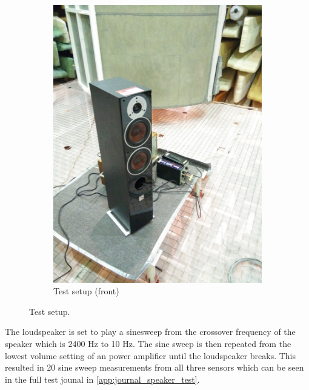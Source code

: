 \begin{figure}[H]
\begin{subfigure}[t]{0.47\textwidth}
	\includegraphics[width=1\textwidth]{figures/Test_setup_front.jpg}
	\caption{Test setup (front)}
	\label{fig:test_setup_front_R}
\end{subfigure}
\caption{Test setup.}
\label{fig:test_setup_R}
\end{figure}

The loudspeaker is set to play a sinesweep from the crossover frequency of the speaker which is 2400 Hz to 10 Hz. The sine sweep is then repeated from the lowest volume setting of an power amplifier until the loudspeaker breaks. This resulted in 20 sine sweep measurements from all three sensors which can be seen in the full test jounal in \autoref{app:journal_speaker_test}.    







